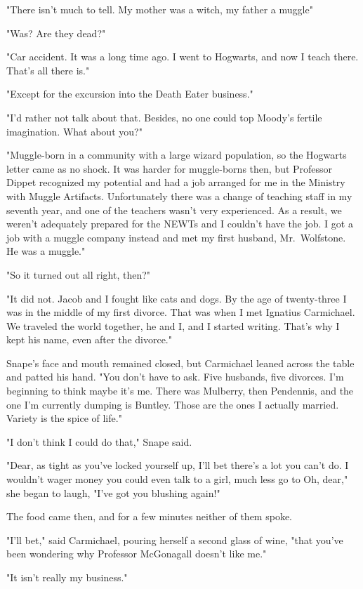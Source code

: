 "There isn't much to tell. My mother was a witch, my father a muggle{\el}"

"Was? Are they dead?"

"Car accident. It was a long time ago. I went to Hogwarts, and now I teach there. That's all there is."

"Except for the excursion into the Death Eater business."

"I'd rather not talk about that. Besides, no one could top Moody's fertile imagination. What about you?"

"Muggle-born in a community with a large wizard population, so the Hogwarts letter came as no shock. It was harder for muggle-borns then, but Professor Dippet recognized my potential and had a job arranged for me in the Ministry with Muggle Artifacts. Unfortunately there was a change of teaching staff in my seventh year, and one of the teachers wasn't very experienced. As a result, we weren't adequately prepared for the NEWTs and I couldn't have the job. I got a job with a muggle company instead and met my first husband, Mr.~Wolfstone. He was a muggle."

"So it turned out all right, then?"

"It did not. Jacob and I fought like cats and dogs. By the age of twenty-three I was in the middle of my first divorce. That was when I met Ignatius Carmichael. We traveled the world together, he and I, and I started writing. That's why I kept his name, even after the divorce."

Snape's face and mouth remained closed, but Carmichael leaned across the table and patted his hand. "You don't have to ask. Five husbands, five divorces. I'm beginning to think maybe it's me. There was Mulberry, then Pendennis, and the one I'm currently dumping is Buntley. Those are the ones I actually married. Variety is the spice of life."

"I don't think I could do that," Snape said.

"Dear, as tight as you've locked yourself up, I'll bet there's a lot you can't do. I wouldn't wager money you could even talk to a girl, much less go to{\el} Oh, dear," she began to laugh, "I've got you blushing again!"

The food came then, and for a few minutes neither of them spoke.

"I'll bet," said Carmichael, pouring herself a second glass of wine, "that you've been wondering why Professor McGonagall doesn't like me."

"It isn't really my business."

